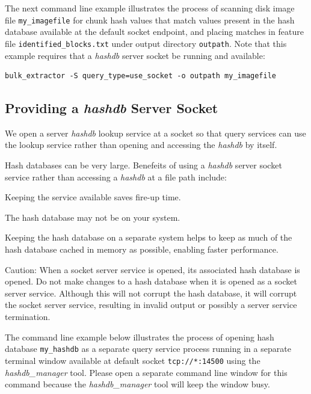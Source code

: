 \documentclass[11pt,twoside]{article}
\newcommand \hdb {\textit{hashdb}\xspace}
\newcommand \hdbm {\textit{hashdb\_manager}\xspace}
\begin{document}
The next command line example illustrates the process of scanning
disk image file \texttt{my\_imagefile}
for chunk hash values that match values present
in the hash database available at the default socket endpoint,
and placing
matches in feature file \texttt{identified\_blocks.txt}
under output directory \texttt{outpath}.
Note that this example requires that a \hdb server socket be running
and available:

\begin{small}
\begin{verbatim}
bulk_extractor -S query_type=use_socket -o outpath my_imagefile
\end{verbatim}
\end{small}

\subsection{Providing a \hdb Server Socket}
We open a server \hdb lookup service at a socket
so that query services can use the lookup service rather than
opening and accessing the \hdb by itself.

Hash databases can be very large.
Benefeits of using a \hdb server socket service
rather than accessing a \hdb at a file path include:
\begin{compactitem}	
\item Keeping the service available saves fire-up time.
\item The hash database may not be on your system.
\item Keeping the hash database on a separate system helps to
keep as much of the hash database cached in memory as possible,
enabling faster performance.
\end{compactitem}	

Caution: When a socket server service is opened,
its associated hash database is opened.
Do not make changes to a hash database
when it is opened as a socket server service.
Although this will not corrupt the hash database,
it will corrupt the socket server service,
resulting in invalid output or possibly a server service termination.

The command line example below illustrates the process of opening
hash database \texttt{my\_hashdb} as a separate
query service process running in a separate terminal window
available at default socket \texttt{tcp://*:14500}
using the \hdbm tool.
Please open a separate command line window for this command
because the \hdbm tool will keep the window busy.
\end{document}
